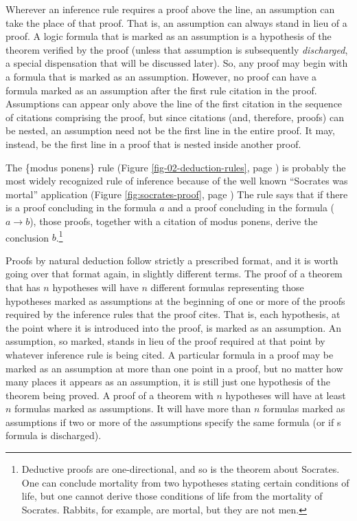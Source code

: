 Wherever an inference rule requires a proof above the line,
an assumption can take the place of that proof.
That is,
an assumption can always stand in lieu of a proof.
A logic formula that is marked as an assumption
is a hypothesis of the theorem verified by the proof
(unless that assumption is subsequently \emph{discharged},
a special dispensation
that will be discussed later).
So, any proof may begin with a formula
that is marked as an assumption.
However, no proof can have
a formula marked as an assumption after
the first rule citation in the proof.
Assumptions can appear only above the line
of the first citation in the sequence of citations
comprising the proof, but since citations
(and, therefore, proofs) can be nested,
an assumption need not be the first line in
the entire proof.
It may, instead, be the first line
in a proof that is nested inside another proof.

The \{modus ponens\} rule
(Figure \ref{fig-02-deduction-rules}, page \pageref{fig-02-deduction-rules})
is probably the most widely recognized rule of inference because
of the well known ``Socrates was mortal'' application
(Figure \ref{fig:socrates-proof}, page \pageref{fig:socrates-proof})
The rule says that if there is a proof concluding in
the formula $a$ and a proof concluding in the formula ($a \rightarrow b$),
those proofs, together with a citation of modus ponens,
derive the conclusion $b$.\footnote{Deductive
proofs are one-directional,
and so is the theorem about Socrates.
One can conclude mortality from two hypotheses stating certain conditions of life,
but one cannot derive those conditions of life from the mortality of Socrates.
Rabbits, for example, are mortal, but they are not men.}

Proofs by natural deduction follow strictly a prescribed format,
and it is worth going over that format again, in slightly different terms.
The proof of a theorem that has
$n$ hypotheses will have $n$ different
formulas representing those hypotheses
marked as assumptions
at the beginning of one or more of the proofs
required by the inference rules that the proof cites.
That is, each hypothesis, at the point where it is introduced
into the proof, is marked as an assumption.
An assumption, so marked, stands in lieu of the proof
required at that point by whatever inference rule is being cited.
A particular formula in a proof may be marked as an assumption
at more than one point in a proof, but no matter how many places
it appears as an assumption, it is still just
one hypothesis of the theorem being proved.
A proof of a theorem with $n$ hypotheses will have at least $n$
formulas marked as assumptions.
It will have more than $n$ formulas marked as assumptions
if two or more of the assumptions specify the same formula
(or if s formula is discharged).

